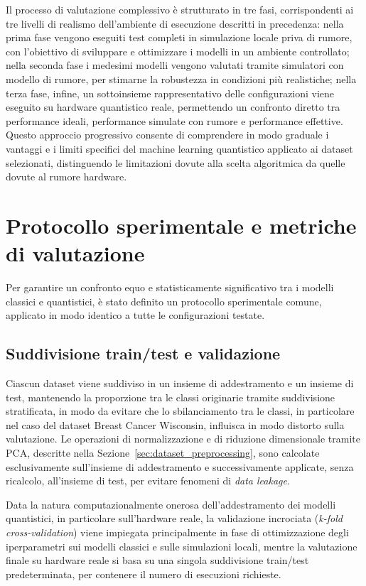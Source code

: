 Il processo di valutazione complessivo è strutturato in tre fasi, corrispondenti ai tre livelli di realismo dell'ambiente di esecuzione descritti in precedenza: nella prima fase vengono eseguiti test completi in simulazione locale priva di rumore, con l'obiettivo di sviluppare e ottimizzare i modelli in un ambiente controllato; nella seconda fase i medesimi modelli vengono valutati tramite simulatori con modello di rumore, per stimarne la robustezza in condizioni più realistiche; nella terza fase, infine, un sottoinsieme rappresentativo delle configurazioni viene eseguito su hardware quantistico reale, permettendo un confronto diretto tra performance ideali, performance simulate con rumore e performance effettive. Questo approccio progressivo consente di comprendere in modo graduale i vantaggi e i limiti specifici del machine learning quantistico applicato ai dataset selezionati, distinguendo le limitazioni dovute alla scelta algoritmica da quelle dovute al rumore hardware.

\section{Protocollo sperimentale e metriche di valutazione}
\label{sec:protocollo_sperimentale}

Per garantire un confronto equo e statisticamente significativo tra i modelli classici e quantistici, è stato definito un protocollo sperimentale comune, applicato in modo identico a tutte le configurazioni testate.

\subsection{Suddivisione train/test e validazione}
Ciascun dataset viene suddiviso in un insieme di addestramento e un insieme di test, mantenendo la proporzione tra le classi originarie tramite suddivisione stratificata, in modo da evitare che lo sbilanciamento tra le classi, in particolare nel caso del dataset Breast Cancer Wisconsin, influisca in modo distorto sulla valutazione. Le operazioni di normalizzazione e di riduzione dimensionale tramite PCA, descritte nella Sezione~\ref{sec:dataset_preprocessing}, sono calcolate esclusivamente sull'insieme di addestramento e successivamente applicate, senza ricalcolo, all'insieme di test, per evitare fenomeni di \textit{data leakage}.

Data la natura computazionalmente onerosa dell'addestramento dei modelli quantistici, in particolare sull'hardware reale, la validazione incrociata (\textit{k-fold cross-validation}) viene impiegata principalmente in fase di ottimizzazione degli iperparametri sui modelli classici e sulle simulazioni locali, mentre la valutazione finale su hardware reale si basa su una singola suddivisione train/test predeterminata, per contenere il numero di esecuzioni richieste.

